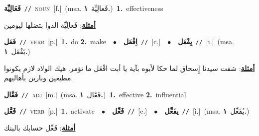 \documentclass[10pt,a4paper,twoside]{article} %
\begin{document}
\begin{multicols}{2}
{\setlength\topsep{0pt}\textbf{\foreignlanguage{arabic}{فَعَالِيِّة}}\ {\color{gray}\texttt{//}\color{black}}\ \textsc{noun}\ [f.]\ \color{gray}(msa. \foreignlanguage{arabic}{فَعالِيِّة}~\foreignlanguage{arabic}{\textbf{١.}})\color{black}\ \textbf{1.}~effectiveness\  \begin{flushright}\color{gray}\foreignlanguage{arabic}{\textbf{\underline{\foreignlanguage{arabic}{أمثلة}}}: فَعالِيِّة الدوا بتضلها ليومين}\end{flushright}\color{black}} \vspace{2mm}

{\setlength\topsep{0pt}\textbf{\foreignlanguage{arabic}{فَعَل}}\ {\color{gray}\texttt{//}\color{black}}\ \textsc{verb}\ [p.]\ \textbf{1.}~do  \textbf{2.}~make\ \ $\bullet$\ \ \setlength\topsep{0pt}\textbf{\foreignlanguage{arabic}{اِفْعَل}}\ {\color{gray}\texttt{//}\color{black}}\ [c.]\ \ $\bullet$\ \ \setlength\topsep{0pt}\textbf{\foreignlanguage{arabic}{يِفْعَل}}\ {\color{gray}\texttt{//}\color{black}}\ [i.]\ \color{gray}(msa. \foreignlanguage{arabic}{يَفْعَل}~\foreignlanguage{arabic}{\textbf{١.}})\color{black}\  \begin{flushright}\color{gray}\foreignlanguage{arabic}{\textbf{\underline{\foreignlanguage{arabic}{أمثلة}}}: شفت سيدنا إِسحاق لما حكا لأبوه بآية يا أبت افْعَل ما تؤمر. هيك الولاد لازم يكونوا مطيعين وبارين بأهاليهم.}\end{flushright}\color{black}} \vspace{2mm}

{\setlength\topsep{0pt}\textbf{\foreignlanguage{arabic}{فَعَّال}}\ {\color{gray}\texttt{//}\color{black}}\ \textsc{adj}\ [m.]\ \color{gray}(msa. \foreignlanguage{arabic}{فَعّال}~\foreignlanguage{arabic}{\textbf{١.}})\color{black}\ \textbf{1.}~effective  \textbf{2.}~influential\ } \vspace{2mm}

{\setlength\topsep{0pt}\textbf{\foreignlanguage{arabic}{فَعَّل}}\ {\color{gray}\texttt{//}\color{black}}\ \textsc{verb}\ [p.]\ \textbf{1.}~activate\ \ $\bullet$\ \ \setlength\topsep{0pt}\textbf{\foreignlanguage{arabic}{فَعِّل}}\ {\color{gray}\texttt{//}\color{black}}\ [c.]\ \ $\bullet$\ \ \setlength\topsep{0pt}\textbf{\foreignlanguage{arabic}{يفَعِّل}}\ {\color{gray}\texttt{//}\color{black}}\ [i.]\ \color{gray}(msa. \foreignlanguage{arabic}{يُفَعِّل}~\foreignlanguage{arabic}{\textbf{١.}})\color{black}\  \begin{flushright}\color{gray}\foreignlanguage{arabic}{\textbf{\underline{\foreignlanguage{arabic}{أمثلة}}}: فَعِّل حسابك بالبنك}\end{flushright}\color{black}} \vspace{2mm}


\end{multicols}
\end{document}

